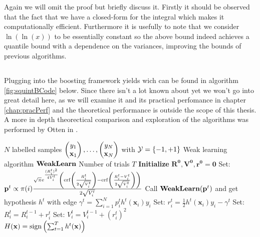  Again we will omit the proof but briefly discuss it. Firstly it should be observed that the fact that we have a closed-form for the integral which makes it computationally efficient. Furthermore it is usefully to note that we consider $\ln(\ln(x))$ to be essentially constant so the above bound indeed achieves a quantile bound with a dependence on the variances, improving the bounds of previous algorithms.

\subsection{\squintB}
\label{subsec:algoSquintB}
Plugging \squint into the boosting framework yields \squintB wich can be found in algorithm \ref{fig:squintBCode} below. Since there isn't a lot known about \squintB yet we won't go into great detail here, as we will examine it and its practical perfomance in chapter \ref{chap:pracPerf} and the theoretical performance is outside the scope of this thesis. A more in depth theorectical comparison and exploration of the algorithms was performed by Otten in \cite{Otten2016}. 
\begin{algorithm} 
\caption{\NHB}
\label{fig:squintBCode}
\begin{algorithmic}[1]
\Require 
\Statex $N$ labelled samples $\Vec{y_1\\ \mathbf x_1},\ldots,\Vec{y_N\\ \mathbf x_N}$  with $\mathcal Y = \set{-1,+1}$ 
\Statex Weak learning algorithm $\weak$
\Statex Number of trials $T$
\Procedure{\squintB}{}
\State \textbf{Initialize} $\mathbf{R^0,V^0,r^0} = \mathbf 0$
\State Set: $\mathbf p^t \propto \pi(i) \frac{\sqrt{\pi}e^{\frac{(R^t_i)^2}{4V^t_i}}\lubke{\erf\lubke{\frac{R^t_i}{2\sqrt{V_i^t}}}-\erf\lubke{\frac{R_i^t-V_i^t}{2\sqrt{V_i^t}}}}}{2\sqrt{V_i^t}} $ 
\State Call $\weak(\mathbf p^t)$ and get hypothesis $h^t$ with edge $\gamma^t = \sum_{i=1}^N p^t_ih^t(\mathbf x_i)y_i$
\State Set: $r_i^t=\frac12h^t(\mathbf x_i)y_i-\gamma^t$ 
\State Set: $R_i^t = R_i^{t-1} + r_i^t $ 
\State Set: $V_i^t = V_i^{t-1} + (r_i^t)^2$
\EndFor\\
\Return $H(\mathbf x) = \sign\lubke{\sum^T_{t=1}h^t(\mathbf{x})}$
\EndProcedure
\end{algorithmic}
\end{algorithm}